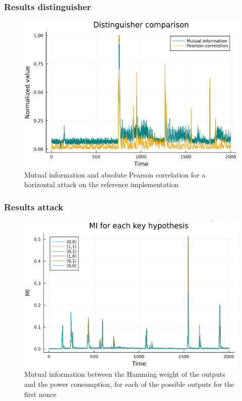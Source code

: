 \documentclass{beamer}
\begin{document}
	\begin{frame}
		\frametitle{Results distinguisher}
		\begin{figure}
			\centering
			\includegraphics[scale=0.3]{img_files/corr_vs_MI_hHW}
			\caption{Mutual information and absolute Pearson correlation for a horizontal attack on the reference implementation}
			\label{corvsMI}
		\end{figure}
	\end{frame}
	
	\begin{frame}
		\frametitle{Results attack}
		\begin{figure}[h]
			\centering
			\includegraphics[scale=0.3]{img_files/nonces_alea}
			\caption{Mutual information between the Hamming weight of the outputs and the power consumption, for each of the possible outputs for the first nonce}
			\label{all_alea}
		\end{figure}
	\end{frame}
	
\end{document}
